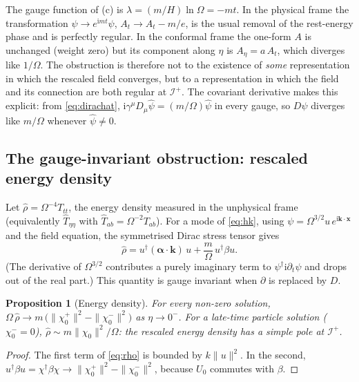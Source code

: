 \documentclass[11pt,a4paper]{article}
\newtheorem{proposition}{Proposition}
\theoremstyle{definition}
\newcommand{\scri}{\mathscr{I}^{+}}
\newcommand{\ii}{\mathrm{i}}
\newcommand{\hpsi}{\hat\psi}
\begin{document}
The gauge function of (c) is $\lambda=(m/H)\ln\Omega=-mt$. In the physical frame the transformation $\psi\to e^{\ii mt}\psi$, $A_{t}\to A_{t}-m/e$, is the usual removal of the rest-energy phase and is perfectly regular. In the conformal frame the one-form $A$ is unchanged (weight zero) but its component along $\eta$ is $A_{\eta}=a\,A_{t}$, which diverges like $1/\Omega$. The obstruction is therefore not to the existence of \emph{some} representation in which the rescaled field converges, but to a representation in which the field and its connection are both regular at $\scri$. The covariant derivative makes this explicit: from \eqref{eq:dirachat}, $\ii\gamma^{\mu}D_{\mu}\hpsi=(m/\Omega)\hpsi$ in every gauge, so $D\hpsi$ diverges like $m/\Omega$ whenever $\hpsi\neq0$.

\subsection{The gauge-invariant obstruction: rescaled energy density}
\label{sec:energy}

Let $\hat\rho=\Omega^{-4}T_{tt}$, the energy density measured in the unphysical frame (equivalently $\hat T_{\eta\eta}$ with $\hat T_{ab}=\Omega^{-2}T_{ab}$). For a mode of \eqref{eq:hk}, using $\psi=\Omega^{3/2}u\,e^{\ii\mathbf{k}\cdot\mathbf{x}}$ and the field equation, the symmetrised Dirac stress tensor gives
\begin{equation}
\hat\rho=u^{\dagger}(\boldsymbol\alpha\cdot\mathbf{k})\,u+\frac{m}{\Omega}\,u^{\dagger}\beta u .
\label{eq:rho}
\end{equation}
(The derivative of $\Omega^{3/2}$ contributes a purely imaginary term to $\psi^{\dagger}\ii\partial_{t}\psi$ and drops out of the real part.) This quantity is gauge invariant when $\partial$ is replaced by $D$.

\begin{proposition}[Energy density]
\label{prop:energy}
For every non-zero solution, $\Omega\,\hat\rho\to m\,\big(\|\chi_{0}^{+}\|^{2}-\|\chi_{0}^{-}\|^{2}\big)$ as $\eta\to0^{-}$. For a late-time particle solution ($\chi_{0}^{-}=0$), $\hat\rho\sim m\|\chi_{0}\|^{2}/\Omega$: the rescaled energy density has a simple pole at $\scri$.
\end{proposition}
\begin{proof}
The first term of \eqref{eq:rho} is bounded by $k\|u\|^{2}$. In the second, $u^{\dagger}\beta u=\chi^{\dagger}\beta\chi\to\|\chi_{0}^{+}\|^{2}-\|\chi_{0}^{-}\|^{2}$, because $U_{0}$ commutes with $\beta$.
\end{proof}
\end{document}
